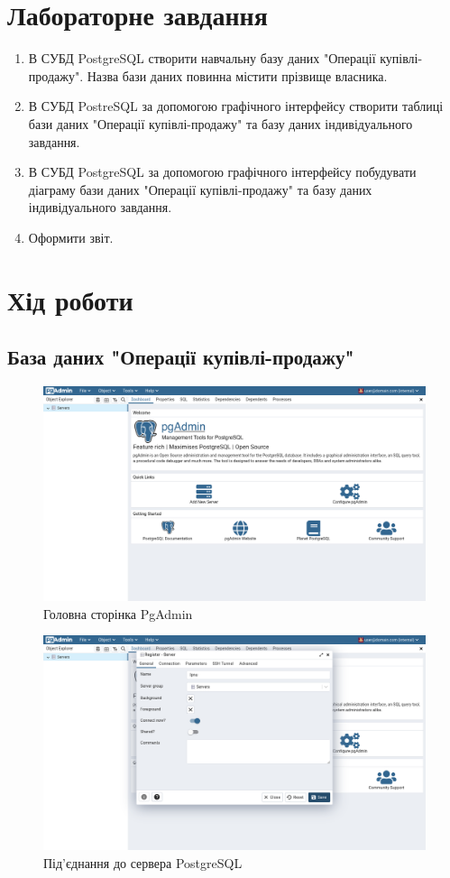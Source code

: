 \documentclass[14pt]{extreport}
\begin{document}
\begin{normalsize}
	\section*{Лабораторне завдання}
	\begin{enumerate}
		\item В СУБД PostgreSQL створити навчальну базу даних "Операції купівлі-продажу". Назва бази даних повинна містити прізвище власника.
		\item В СУБД PostreSQL за допомогою графічного інтерфейсу створити таблиці бази даних "Операції купівлі-продажу" та базу даних індивідуального завдання.
		\item В СУБД PostgreSQL за допомогою графічного інтерфейсу побудувати діаграму бази даних "Операції купівлі-продажу" та базу даних індивідуального завдання.
		\item Оформити звіт.
	\end{enumerate}
	
	\section*{Хід роботи}
	\subsection*{База даних "Операції купівлі-продажу"}
	\iffalse
	\begin{figure}[H]
		\centering
		\includegraphics[scale=0.35]{1}
		\caption{Головна сторінка PgAdmin}
	\end{figure}

	\begin{figure}[H]
		\centering
		\includegraphics[scale=0.35]{2}
		\caption{Під'єднання до сервера PostgreSQL}
	\end{figure}
	

\end{normalsize}
\end{document}
